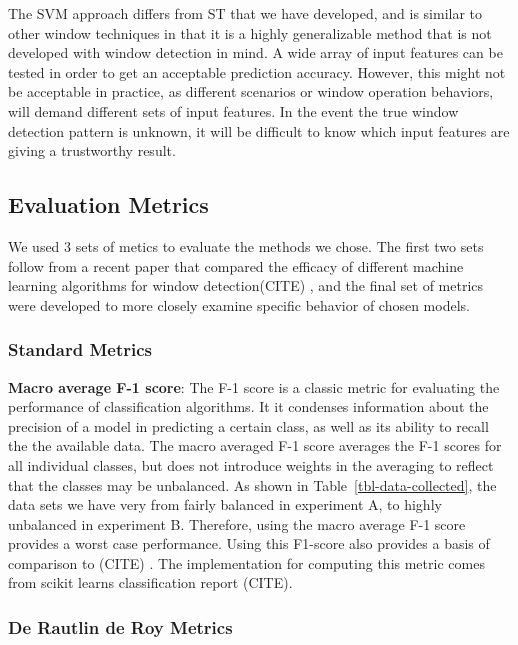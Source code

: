 \documentclass[sigconf]{acmart}
\begin{document}
The SVM approach differs from ST that we have developed, and is similar
to other window techniques in that it is a highly generalizable method
that is not developed with window detection in mind. A wide array of
input features can be tested in order to get an acceptable prediction
accuracy. However, this might not be acceptable in practice, as
different scenarios or window operation behaviors, will demand different
sets of input features. In the event the true window detection pattern
is unknown, it will be difficult to know which input features are giving
a trustworthy result.

\hypertarget{evaluation-metrics}{%
\subsection{Evaluation Metrics}\label{evaluation-metrics}}

We used 3 sets of metics to evaluate the methods we chose. The first two
sets follow from a recent paper that compared the efficacy of different
machine learning algorithms for window detection(CITE) , and the final
set of metrics were developed to more closely examine specific behavior
of chosen models.

\hypertarget{standard-metrics}{%
\subsubsection{Standard Metrics}\label{standard-metrics}}

\textbf{Macro average F-1 score}: The F-1 score is a classic metric for
evaluating the performance of classification algorithms. It it condenses
information about the precision of a model in predicting a certain
class, as well as its ability to recall the the available data. The
macro averaged F-1 score averages the F-1 scores for all individual
classes, but does not introduce weights in the averaging to reflect that
the classes may be unbalanced. As shown in
Table~\ref{tbl-data-collected}, the data sets we have very from fairly
balanced in experiment A, to highly unbalanced in experiment B.
Therefore, using the macro average F-1 score provides a worst case
performance. Using this F1-score also provides a basis of comparison to
(CITE) . The implementation for computing this metric comes from scikit
learns classification report (CITE).

\hypertarget{de-rautlin-de-roy-metrics}{%
\subsubsection{De Rautlin de Roy
Metrics}\label{de-rautlin-de-roy-metrics}}
\end{document}
